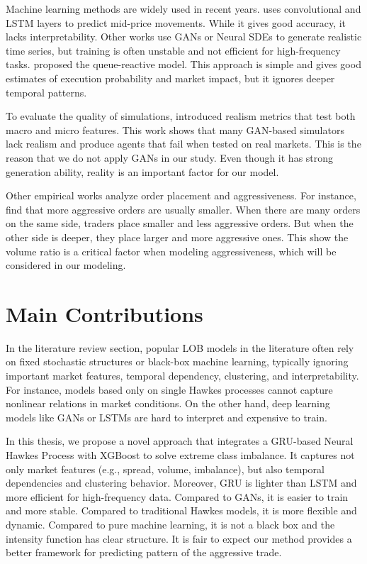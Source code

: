 Machine learning methods are widely used in recent years. \cite{briola_deep_2024} uses convolutional and LSTM layers to predict mid-price movements. While it gives good accuracy, it lacks interpretability. Other works use GANs \citep{brophy_quick_2019} or Neural SDEs \citep{issa_non-adversarial_2023} to generate realistic time series, but training is often unstable and not efficient for high-frequency tasks. \cite{huang_simulating_2014} proposed the queue-reactive model. This approach is simple and gives good estimates of execution probability and market impact, but it ignores deeper temporal patterns.

To evaluate the quality of simulations, \cite{vyetrenko_get_2019} introduced realism metrics that test both macro and micro features. This work shows that many GAN-based simulators lack realism and produce agents that fail when tested on real markets. This is the reason that we do not apply GANs in our study. Even though it has strong generation ability, reality is an important factor for our model.

Other empirical works analyze order placement and aggressiveness. For instance, \cite{lo_order_2010} find that more aggressive orders are usually smaller. When there are many orders on the same side, traders place smaller and less aggressive orders. But when the other side is deeper, they place larger and more aggressive ones. This show the volume ratio is a critical factor when modeling aggressiveness, which will be considered in our modeling.


\section{Main Contributions}
In the literature review section, popular LOB models in the literature often rely on fixed stochastic structures or black-box machine learning, typically ignoring important market features, temporal dependency, clustering, and interpretability. For instance, models based only on single Hawkes processes cannot capture nonlinear relations in market conditions. On the other hand, deep learning models like GANs or LSTMs are hard to interpret and expensive to train.

In this thesis, we propose a novel approach that integrates a GRU-based Neural Hawkes Process with XGBoost to solve extreme class imbalance. It captures not only market features (e.g., spread, volume, imbalance), but also temporal dependencies and clustering behavior. Moreover, GRU is lighter than LSTM and more efficient for high-frequency data. Compared to GANs, it is easier to train and more stable. Compared to traditional Hawkes models, it is more flexible and dynamic. Compared to pure machine learning, it is not a black box and the intensity function has clear structure. It is fair to expect our method provides a better framework for predicting pattern of the aggressive trade.

